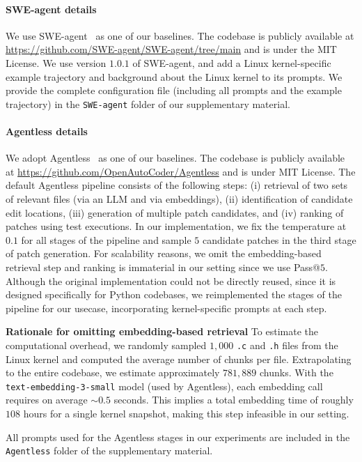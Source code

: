 \paragraph{SWE-agent details}
We use SWE-agent~\citep{yang2024sweagentagentcomputerinterfacesenable} as one of our baselines. The codebase is publicly available at \url{https://github.com/SWE-agent/SWE-agent/tree/main} and is under the MIT License. We use version $1.0.1$ of SWE-agent, and add a Linux kernel-specific example trajectory and background about the Linux kernel to its prompts.
We provide the complete configuration file (including all prompts and the example trajectory) in the \texttt{SWE-agent} folder of our supplementary material.

\paragraph{Agentless details}
We adopt Agentless~\citep{xia2024agentlessdemystifyingllmbasedsoftware} as one of our baselines. The codebase is publicly available at \url{https://github.com/OpenAutoCoder/Agentless} and is under MIT License. The default Agentless pipeline consists of the following steps: (i) retrieval of two sets of relevant files (via an LLM and via embeddings), (ii) identification of candidate edit locations, (iii) generation of multiple patch candidates, and (iv) ranking of patches using test executions.
In our implementation, we fix the temperature at $0.1$ for all stages of the pipeline and sample $5$ candidate patches in the third stage of patch generation.
For scalability reasons, we omit the embedding-based retrieval step and ranking is immaterial in our setting since we use Pass@$5$.
Although the original implementation could not be directly reused, since it is designed specifically for Python codebases, we reimplemented the stages of the pipeline for our usecase, incorporating kernel-specific prompts at each step.

\textbf{Rationale for omitting embedding-based retrieval}
To estimate the computational overhead, we randomly sampled $1,000$ \texttt{.c} and \texttt{.h} files from the Linux kernel and computed the average number of chunks per file. Extrapolating to the entire codebase, we estimate approximately $781,889$ chunks. With the \texttt{text-embedding-3-small} model (used by Agentless), each embedding call requires on average $\sim 0.5$ seconds. This implies a total embedding time of roughly $108$ hours for a single kernel snapshot, making this step infeasible in our setting. 

All prompts used for the Agentless stages in our experiments are included in the \texttt{Agentless} folder of the supplementary material.
